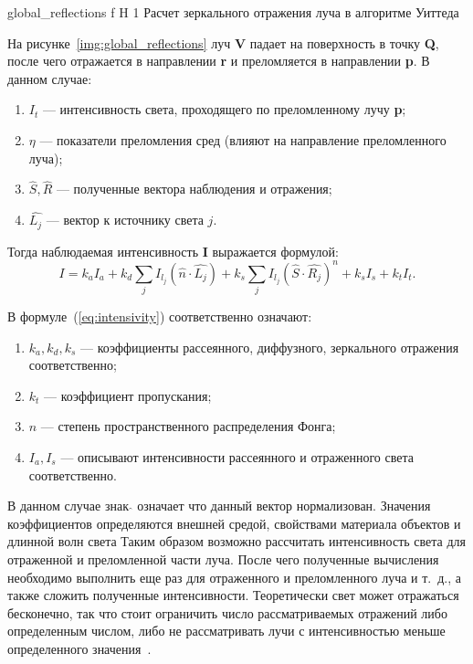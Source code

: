 {global_reflections} %
{f} %
{H} %
{1\textwidth} %
{Расчет зеркального отражения луча в алгоритме Уиттеда} %


На рисунке~\ref{img:global_reflections} луч \textbf{V} падает на поверхность в точку \textbf{Q}, после чего отражается в направлении \textbf{r} и преломляется
в направлении \textbf{p}.
В данном случае:
\begin{enumerate}
	\item $I_t$ --- интенсивность света, проходящего по преломленному лучу \textbf{p};
	\item $\eta$ --- показатели преломления сред (влияют на направление преломленного луча);
	\item $\hat{S},\hat{R}$ --- полученные вектора наблюдения и отражения;
	\item $\hat{L_j}$ --- вектор к источнику света $j$.

\end{enumerate}

Тогда наблюдаемая интенсивность \textbf{I} выражается формулой:
\begin{equation} 
	I = k_aI_a + k_d \sum_{j} I_{l_j}(\hat{n} \cdot \hat{L_j}) + k_s \sum_{j} I_{l_j}(\hat{S} \cdot \hat{R_j})^n + k_sI_s + k_tI_t.
	\label{eq:intensivity}
\end{equation}

В формуле~(\ref{eq:intensivity}) соответственно означают:
\begin{enumerate}
	\item $k_a,k_d,k_s$ --- коэффициенты рассеянного, диффузного, зеркального отражения соответственно;
	\item $k_t$ --- коэффициент пропускания;
	\item $n$ --- степень пространственного распределения Фонга;
	\item $I_{a},I_{s}$ --- описывают интенсивности рассеянного и отраженного света соответственно.
\end{enumerate}
В данном случае знак $ \hat{} $  означает что данный вектор нормализован.
Значения коэффициентов определяются внешней средой, свойствами материала объектов и длинной волн света
Таким образом возможно рассчитать интенсивность света для отраженной и преломленной части луча.
После чего полученные вычисления необходимо выполнить еще раз для отраженного и преломленного луча и т.~д., а также сложить полученные интенсивности.
Теоретически свет может отражаться бесконечно, так что стоит ограничить число рассматриваемых отражений либо определенным числом,
либо не рассматривать лучи с интенсивностью меньше определенного значения~\cite{Rodgers}.






